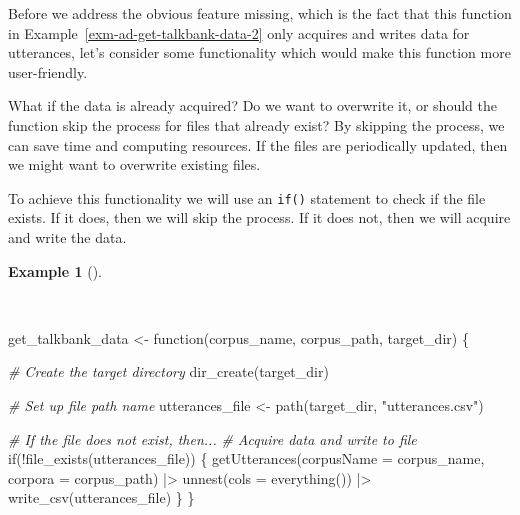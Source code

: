 \documentclass[
  letterpaper,
]{latex/krantz}
\newenvironment{Shaded}{\begin{snugshade}}{\end{snugshade}}
\newcommand{\AttributeTok}[1]{\textcolor[rgb]{0.00,0.00,0.00}{#1}}
\newcommand{\CommentTok}[1]{\textcolor[rgb]{0.00,0.00,0.00}{\textit{#1}}}
\newcommand{\ControlFlowTok}[1]{\textcolor[rgb]{0.00,0.00,0.00}{#1}}
\newcommand{\FunctionTok}[1]{\textcolor[rgb]{0.00,0.00,0.00}{#1}}
\newcommand{\NormalTok}[1]{\textcolor[rgb]{0.00,0.00,0.00}{#1}}
\newcommand{\OtherTok}[1]{\textcolor[rgb]{0.00,0.00,0.00}{#1}}
\newcommand{\SpecialCharTok}[1]{\textcolor[rgb]{0.00,0.00,0.00}{#1}}
\newcommand{\StringTok}[1]{\textcolor[rgb]{0.00,0.00,0.00}{#1}}
\theoremstyle{definition}
\newtheorem{example}{Example}[chapter]
\theoremstyle{remark}
\begin{document}
Before we address the obvious feature missing, which is the fact that
this function in Example~\ref{exm-ad-get-talkbank-data-2} only acquires
and writes data for utterances, let's consider some functionality which
would make this function more user-friendly.

What if the data is already acquired? Do we want to overwrite it, or
should the function skip the process for files that already exist? By
skipping the process, we can save time and computing resources. If the
files are periodically updated, then we might want to overwrite existing
files.

To achieve this functionality we will use an \texttt{if()} statement to
check if the file exists. If it does, then we will skip the process. If
it does not, then we will acquire and write the data.

\begin{example}[]\protect\hypertarget{exm-ad-get-talkbank-data-3}{}\label{exm-ad-get-talkbank-data-3}

~

\begin{Shaded}
\begin{Highlighting}[]
\NormalTok{get\_talkbank\_data }\OtherTok{\textless{}{-}} \ControlFlowTok{function}\NormalTok{(corpus\_name, corpus\_path, target\_dir) \{}

  \CommentTok{\# Create the target directory}
  \FunctionTok{dir\_create}\NormalTok{(target\_dir)}

  \CommentTok{\# Set up file path name}
\NormalTok{  utterances\_file  }\OtherTok{\textless{}{-}} \FunctionTok{path}\NormalTok{(target\_dir, }\StringTok{"utterances.csv"}\NormalTok{)}

  \CommentTok{\# If the file does not exist, then...}
  \CommentTok{\# Acquire data and write to file}
  \ControlFlowTok{if}\NormalTok{(}\SpecialCharTok{!}\FunctionTok{file\_exists}\NormalTok{(utterances\_file)) \{}
    \FunctionTok{getUtterances}\NormalTok{(}\AttributeTok{corpusName =}\NormalTok{ corpus\_name, }\AttributeTok{corpora =}\NormalTok{ corpus\_path) }\SpecialCharTok{|\textgreater{}}
      \FunctionTok{unnest}\NormalTok{(}\AttributeTok{cols =} \FunctionTok{everything}\NormalTok{()) }\SpecialCharTok{|\textgreater{}}
      \FunctionTok{write\_csv}\NormalTok{(utterances\_file)}
\NormalTok{  \}}
\NormalTok{\}}
\end{Highlighting}
\end{Shaded}

\end{example}
\end{document}
